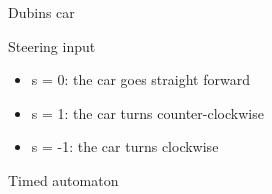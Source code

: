 \documentclass[10pt, xcolor={usenames, dvipsnames}]{beamer}
\begin{document}
\begin{frame}{Dubins car}
            \begin{block}{Steering input}
                \begin{itemize}[<+->]
                    \item s = 0: the car goes straight forward
                    \item s = 1: the car turns counter-clockwise
                    \item s = -1: the car turns clockwise
                \end{itemize}
            \end{block}
        \end{frame}

        \begin{frame}{Timed automaton}
            \centering
            
            \begin{minipage}[c]{.5\textwidth}
                \begin{figure}
\end{figure}
\end{minipage}
\end{frame}
\end{document}
